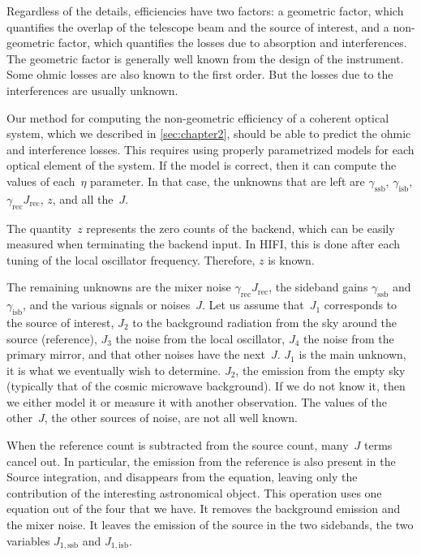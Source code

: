 Regardless of the details, efficiencies have two factors: a geometric factor, which quantifies the overlap of the telescope beam and the source of interest, and a non-geometric factor, which quantifies the losses due to absorption and interferences.
The geometric factor is generally well known from the design of the instrument.
Some ohmic losses are also known to the first order.
But the losses due to the interferences are usually unknown.

Our method for computing the non-geometric efficiency of a coherent optical system, which we described in \cref{sec:chapter2}, should be able to predict the ohmic and interference losses.
This requires using properly parametrized models for each optical element of the system.
If the model is correct, then it can compute the values of each~$\eta$ parameter.
In that case, the unknowns that are left are $\gamma_\text{ssb}$, $\gamma_\text{isb}$,
$\gamma_\text{rec} J_\text{rec}$, $z$, and all the~$J$.

The quantity~$z$ represents the zero counts of the backend, which can be easily measured when terminating the backend input.
In HIFI, this is done after each tuning of the local oscillator frequency.
Therefore, $z$ is known.

The remaining unknowns are the mixer noise $\gamma_\text{rec} J_\text{rec}$, the sideband gains $\gamma_\text{ssb}$ and $\gamma_\text{isb}$, and the various signals or noises~$J$.
Let us assume that~$J_1$ corresponds to the source of interest, $J_2$ to the background radiation from the sky around the source (reference), $J_3$ the noise from the local oscillator, $J_4$ the noise from the primary mirror, and that other noises have the next~$J$.
$J_1$ is the main unknown, it is what we eventually wish to determine.
$J_2$, the emission from the empty sky (typically that of the cosmic microwave background).  If we do not know it, then we either model it or measure it with another observation.
The values of the other~$J$, the other sources of noise, are not all well known.

When the reference count is subtracted from the source count, many~$J$ terms cancel out.
In particular, the emission from the reference is also present in the Source integration, and disappears from the equation, leaving only the contribution of the interesting astronomical object.
This operation uses one equation out of the four that we have.
It removes the background emission and the mixer noise.
It leaves the emission of the source in the two sidebands, the two variables $J_{1,\text{ssb}}$ and $J_{1,\text{isb}}$.

